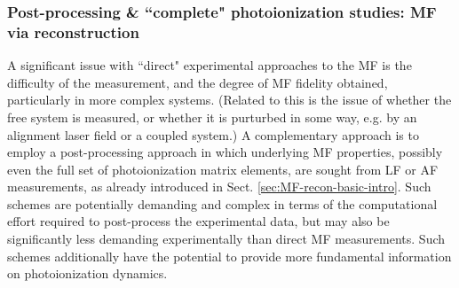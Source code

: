 
\subsubsection{Post-processing \& ``complete" photoionization studies: MF via reconstruction\label{sec:MF-recon-expt}}


A significant issue with ``direct" experimental approaches to the MF is the difficulty of the measurement, and the degree of MF fidelity obtained, particularly in more complex systems. (Related to this is the issue of whether the free system is measured, or whether it is purturbed in some way, e.g. by an alignment laser field or a coupled system.) A complementary approach is to employ a post-processing approach in which underlying MF properties, possibly even the full set of photoionization matrix elements, are sought from LF or AF measurements, as already introduced in Sect. \ref{sec:MF-recon-basic-intro}. Such schemes are potentially demanding and complex in terms of the computational effort required to post-process the experimental data, but may also be significantly less demanding experimentally than direct MF measurements. Such schemes additionally have the potential to provide more fundamental information on photoionization dynamics.

